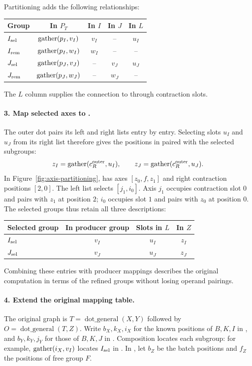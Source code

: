 Partitioning adds the following relationships:
\begin{center}
\small
\begin{tabular}{@{}lcccc@{}}\toprule
Group & In $P_T$ & In $I$ & In $J$ & In $L$\\\midrule
$I_{\mathrm{sel}}$ & $\operatorname{gather}(p_I,v_I)$ & $v_I$ & -- & $u_I$\\
$I_{\mathrm{rem}}$ & $\operatorname{gather}(p_I,w_I)$ & $w_I$ & -- & --\\
$J_{\mathrm{sel}}$ & $\operatorname{gather}(p_J,v_J)$ & -- & $v_J$ & $u_J$\\
$J_{\mathrm{rem}}$ & $\operatorname{gather}(p_J,w_J)$ & -- & $w_J$ & --\\\bottomrule
\end{tabular}
\end{center}
The $L$ column supplies the connection to  through contraction slots.

\paragraph{3. Map selected axes to .}
The outer dot pairs its left and right lists entry by entry. Selecting slots
$u_I$ and $u_J$ from its right list therefore gives the positions in 
paired with the selected subgroups:
\begin{equation}
 z_I=\operatorname{gather}(c_R^{\mathrm{outer}},u_I),\qquad
 z_J=\operatorname{gather}(c_R^{\mathrm{outer}},u_J).
\label{eq:z-partners}
\end{equation}
In Figure~\ref{fig:axis-partitioning},  has axes $[z_0,f,z_1]$ and
right contraction positions $[2,0]$. The left list selects $[j_1,i_0]$.
Axis $j_1$ occupies contraction slot $0$ and pairs with $z_1$ at position $2$;
$i_0$ occupies slot $1$ and pairs with $z_0$ at position $0$.
The selected groups thus retain all three descriptions:
\begin{center}
\begin{tabular}{@{}lccc@{}}\toprule
Selected group & In producer group & Slots in $L$ & In $Z$\\\midrule
$I_{\mathrm{sel}}$ & $v_I$ & $u_I$ & $z_I$\\
$J_{\mathrm{sel}}$ & $v_J$ & $u_J$ & $z_J$\\\bottomrule
\end{tabular}
\end{center}
Combining these entries with producer mappings describes the original
computation in terms of the refined groups without losing operand pairings.

\paragraph{4. Extend the original mapping table.}
The original graph is $T=\operatorname{dot\_general}(X,Y)$ followed by
$O=\operatorname{dot\_general}(T,Z)$. Write $b_X,k_X,i_X$ for the known
positions of $B,K,I$ in , and $b_Y,k_Y,j_Y$ for those of $B,K,J$ in
. Composition locates each subgroup: for example,
$\operatorname{gather}(i_X,v_I)$ locates $I_{\mathrm{sel}}$ in . In , let $b_Z$ be the
batch positions and $f_Z$ the positions of free group $F$.

